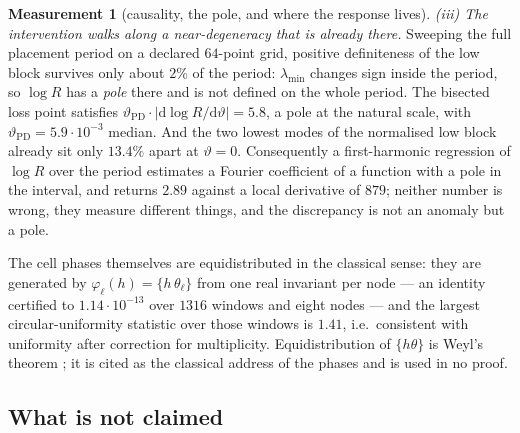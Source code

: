 \documentclass[11pt,a4paper]{article}
\theoremstyle{plain}
\theoremstyle{definition}
\newtheorem{measurement}[theorem]{Measurement}
\newcommand{\lmin}{\lambda_{\min}}
\begin{document}
\begin{measurement}[causality, the pole, and where the response lives]
\emph{(iii) The intervention walks along a near-degeneracy that is already
there.} Sweeping the full placement period on a declared $64$-point grid,
positive definiteness of the low block survives only about $2\%$ of the period:
$\lmin$ changes sign inside the period, so $\log R$ has a \emph{pole} there and
is not defined on the whole period. The bisected loss point satisfies
$\vartheta_{\mathrm{PD}}\cdot|\mathrm d\log R/\mathrm d\vartheta|=5.8$, a pole at
the natural scale, with $\vartheta_{\mathrm{PD}}=5.9\cdot10^{-3}$ median. And
the two lowest modes of the normalised low block already sit only $13.4\%$ apart
at $\vartheta=0$. Consequently a first-harmonic regression of $\log R$ over the
period estimates a Fourier coefficient of a function with a pole in the
interval, and returns $2.89$ against a local derivative of $879$; neither number
is wrong, they measure different things, and the discrepancy is not an anomaly
but a pole.

The cell phases themselves are equidistributed in the classical sense: they are
generated by $\varphi_\ell(h)=\{h\,\theta_\ell\}$ from one real invariant per
node --- an identity certified to $1.14\cdot10^{-13}$ over $1316$ windows and
eight nodes --- and the largest circular-uniformity statistic over those windows
is $1.41$, i.e.\ consistent with uniformity after correction for multiplicity.
Equidistribution of $\{h\theta\}$ is Weyl's theorem \cite{Weyl1916}; it is cited
as the classical address of the phases and is used in no proof.
\end{measurement}

\subsection{What is not claimed}
\label{sec:notclaimed}
\end{document}
